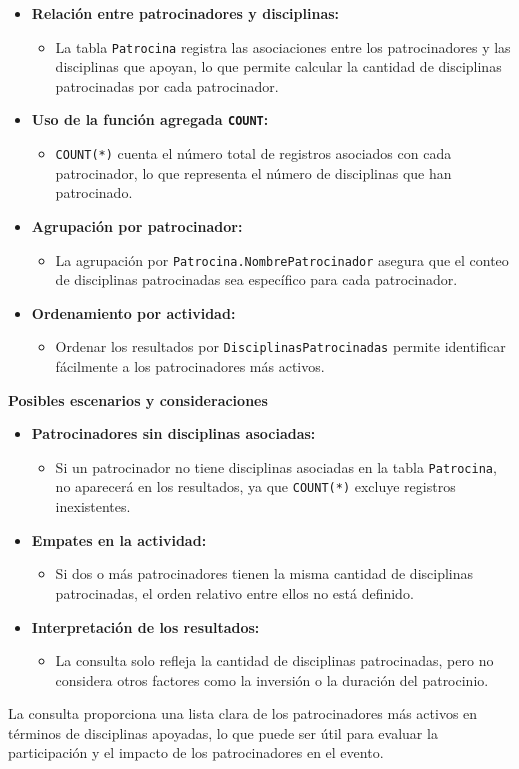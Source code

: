\begin{itemize} \item \textbf{Relación entre patrocinadores y disciplinas:} \begin{itemize} \item La tabla \texttt{Patrocina} registra las asociaciones entre los patrocinadores y las disciplinas que apoyan, lo que permite calcular la cantidad de disciplinas patrocinadas por cada patrocinador. \end{itemize}
	
	\item \textbf{Uso de la función agregada \texttt{COUNT}:} \begin{itemize} \item \texttt{COUNT(*)} cuenta el número total de registros asociados con cada patrocinador, lo que representa el número de disciplinas que han patrocinado. \end{itemize}
	
	\item \textbf{Agrupación por patrocinador:} \begin{itemize} \item La agrupación por \texttt{Patrocina.NombrePatrocinador} asegura que el conteo de disciplinas patrocinadas sea específico para cada patrocinador. \end{itemize}
	
	\item \textbf{Ordenamiento por actividad:} \begin{itemize} \item Ordenar los resultados por \texttt{DisciplinasPatrocinadas} permite identificar fácilmente a los patrocinadores más activos. \end{itemize} \end{itemize}

\textbf{Posibles escenarios y consideraciones}

\begin{itemize} \item \textbf{Patrocinadores sin disciplinas asociadas:} \begin{itemize} \item Si un patrocinador no tiene disciplinas asociadas en la tabla \texttt{Patrocina}, no aparecerá en los resultados, ya que \texttt{COUNT(*)} excluye registros inexistentes. \end{itemize}
	
	\item \textbf{Empates en la actividad:} \begin{itemize} \item Si dos o más patrocinadores tienen la misma cantidad de disciplinas patrocinadas, el orden relativo entre ellos no está definido. \end{itemize}
	
	\item \textbf{Interpretación de los resultados:} \begin{itemize} \item La consulta solo refleja la cantidad de disciplinas patrocinadas, pero no considera otros factores como la inversión o la duración del patrocinio. \end{itemize} \end{itemize}

La consulta proporciona una lista clara de los patrocinadores más activos en términos de disciplinas apoyadas, lo que puede ser útil para evaluar la participación y el impacto de los patrocinadores en el evento.
